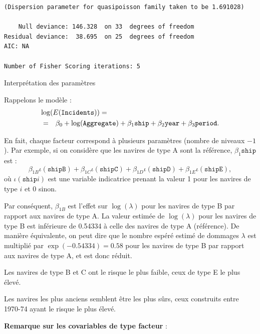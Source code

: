 \documentclass{BeamerTemplate}
\begin{document}
\begin{refsection}
\begin{frame}[fragile]{}
{\begin{verbatim}
(Dispersion parameter for quasipoisson family taken to be 1.691028)

    Null deviance: 146.328  on 33  degrees of freedom
Residual deviance:  38.695  on 25  degrees of freedom
AIC: NA

Number of Fisher Scoring iterations: 5
\end{verbatim}
}
\end{frame}

\begin{frame}{Interprétation des paramètres}

Rappelons le modèle :
\begin{eqnarray*}
\lefteqn{\log(E(\texttt{Incidents})) = \hspace*{4cm}}\\
& = & \beta_0 + \log(\texttt{Aggregate}) + \beta_1 \texttt{ship} + \beta_2
\texttt{year}  + \beta_3 \texttt{period}.
\end{eqnarray*}

\bigskip
En fait, chaque facteur correspond à plusieurs paramètres (nombre de
niveaux $-1$). Par exemple, si on considère que les navires de type A sont la
référence, $\beta_1 \texttt{ship}$ est :
$$ \beta_{1B} \iota(\texttt{shipB}) +\beta_{1C} \iota(\texttt{shipC})
+ \beta_{1D} \iota(\texttt{shipD}) + \beta_{1E} \iota(\texttt{shipE}),$$
où $\iota(\texttt{ship}i)$ est une variable indicatrice prenant la valeur
1 pour les navires de type $i$ et 0 sinon.
\end{frame}

\begin{frame}{}
Par conséquent, $\beta_{1B}$ est l'effet sur $\log(\lambda)$ pour les navires de
type B par rapport aux navires de type A. La valeur estimée de
$\log(\lambda)$ pour les navires de type B est inférieure de 0.54334 à celle des navires
de type A (référence).  De manière équivalente, on peut dire que le
nombre espéré estimé de dommages $\lambda$ est multiplié par
$\exp(-0.54334)=0.58$ pour les navires de type B par rapport aux navires de type A,
et est donc réduit.

\bigskip
Les navires de type B et C ont le risque le plus faible, ceux de type E le
plus élevé.

\bigskip
Les navires les plus anciens semblent être les plus sûrs, ceux construits entre
1970-74 ayant le risque le plus élevé.
\end{frame}

\begin{frame}{}
\textbf{Remarque sur les covariables de type facteur} :


\end{frame}
\end{refsection}
\end{document}
